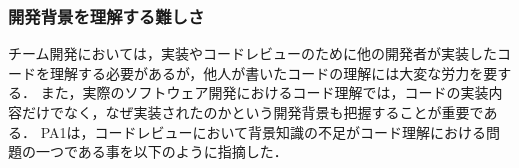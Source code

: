 \subsubsection*{開発背景を理解する難しさ}




チーム開発においては，実装やコードレビューのために他の開発者が実装したコードを理解する必要があるが，他人が書いたコードの理解には大変な労力を要する．
また，実際のソフトウェア開発におけるコード理解では，コードの実装内容だけでなく，なぜ実装されたのかという開発背景も把握することが重要である．
PA1は，コードレビューにおいて背景知識の不足がコード理解における問題の一つである事を以下のように指摘した．




